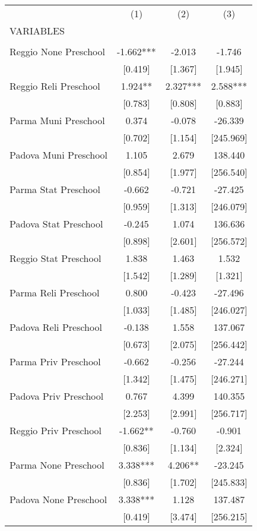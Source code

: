 \begin{tabular}{lccc} \hline
 & (1) & (2) & (3) \\
VARIABLES &  &  &  \\ \hline
 &  &  &  \\
Reggio None Preschool & -1.662*** & -2.013 & -1.746 \\
 & [0.419] & [1.367] & [1.945] \\
Reggio Reli Preschool & 1.924** & 2.327*** & 2.588*** \\
 & [0.783] & [0.808] & [0.883] \\
Parma Muni Preschool & 0.374 & -0.078 & -26.339 \\
 & [0.702] & [1.154] & [245.969] \\
Padova Muni Preschool & 1.105 & 2.679 & 138.440 \\
 & [0.854] & [1.977] & [256.540] \\
Parma Stat Preschool & -0.662 & -0.721 & -27.425 \\
 & [0.959] & [1.313] & [246.079] \\
Padova Stat Preschool & -0.245 & 1.074 & 136.636 \\
 & [0.898] & [2.601] & [256.572] \\
Reggio Stat Preschool & 1.838 & 1.463 & 1.532 \\
 & [1.542] & [1.289] & [1.321] \\
Parma Reli Preschool & 0.800 & -0.423 & -27.496 \\
 & [1.033] & [1.485] & [246.027] \\
Padova Reli Preschool & -0.138 & 1.558 & 137.067 \\
 & [0.673] & [2.075] & [256.442] \\
Parma Priv Preschool & -0.662 & -0.256 & -27.244 \\
 & [1.342] & [1.475] & [246.271] \\
Padova Priv Preschool & 0.767 & 4.399 & 140.355 \\
 & [2.253] & [2.991] & [256.717] \\
Reggio Priv Preschool & -1.662** & -0.760 & -0.901 \\
 & [0.836] & [1.134] & [2.324] \\
Parma None Preschool & 3.338*** & 4.206** & -23.245 \\
 & [0.836] & [1.702] & [245.833] \\
Padova None Preschool & 3.338*** & 1.128 & 137.487 \\
 & [0.419] & [3.474] & [256.215] \\

\end{tabular}
